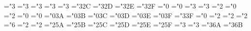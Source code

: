 { \def\bmuparrow{\delimiter"3\mtbsy@@22378 }%
 \def\bmdownarrow{\delimiter"3\mtbsy@@23379 }%
 \mathchardef\bmnearrow="3
 \mathchardef\bmsearrow="3
 \mathchardef\bmsimeq="3
 \mathchardef\bmLeftarrow="3
 \mathchardef\bmRightarrow="3
 \def\bmUparrow{\delimiter"3\mtbsy@@2A\mtbex@@7E }%
 \def\bmDownarrow{\delimiter"3\mtbsy@@2B\mtbex@@7F }%
 \mathchardef\bmLeftrightarrow="3\mtbsy@@2C
 \mathchardef\bmnwarrow="3\mtbsy@@2D
 \mathchardef\bmswarrow="3\mtbsy@@2E
 \mathchardef\bmpropto="3\mtbsy@@2F
 \mathchardef\bmprime="0
 \mathchardef\bminfty="0
 \mathchardef\bmin="3
 \mathchardef\bmni="3 \let\bmowns=\bmni
 \mathchardef\bmbigtriangleup="2
 \mathchardef\bmtriangle="0
 \mathchardef\bmbigtriangledown="2
 \mathchardef\bmforall="0
 \mathchardef\bmexists="0
 \mathchardef\bmneg="0\mtbsy@@3A \let\lnot=\neg
 \mathchardef\bmemptyset="0\mtbsy@@3B
 \mathchardef\bmRe="0\mtbsy@@3C
 \mathchardef\bmIm="0\mtbsy@@3D
 \mathchardef\bmtop="0\mtbsy@@3E
 \mathchardef\bmbot="0\mtbsy@@3F
 \mathchardef\bmperp="3\mtbsy@@3F
 \mathchardef\bmaleph="0
 \mathchardef\bmcomp="2
 \def\bmvec{\mathaccent"0\mtbsy@@45 }%
 \mathchardef\bmtriangleright="2
 \mathchardef\bmtriangleleft="2
 \mathchardef\bmcolon="6
 \mathchardef\bmsetdif="2
 \mathchardef\bmcupprod="2
 \mathchardef\bmcapprod="2\mtbsy@@5A
 \mathchardef\bmcup="2\mtbsy@@5B
 \mathchardef\bmcap="2\mtbsy@@5C
 \mathchardef\bmuplus="2\mtbsy@@5D
 \mathchardef\bmwedge="2\mtbsy@@5E \let\bmland=\bmwedge
 \mathchardef\bmvee="2\mtbsy@@5F \let\bmlor=\bmvee
 \mathchardef\bmvdash="3
 \mathchardef\bmdashv="3
 \def\bmlfloor{\delimiter"4\mtbsy@@62\mtbex@@04 }%
 \def\bmrfloor{\delimiter"5\mtbsy@@63\mtbex@@05 }%
 \def\bmlceil{\delimiter"4\mtbsy@@64\mtbex@@06 }%
 \def\bmrceil{\delimiter"5\mtbsy@@65\mtbex@@07 }%
 \def\bmlbrace{\delimiter"4\mtbsy@@66\mtbex@@08 }%
 \def\bmrbrace{\delimiter"5\mtbsy@@67\mtbex@@09 }%
 \def\bmlangle{\delimiter"4\mtbsy@@68\mtbex@@0A }%
 \def\bmrangle{\delimiter"5\mtbsy@@69\mtbex@@0B }%
 \mathchardef\bmmid="3\mtbsy@@6A
 \def\bmvert{\delimiter"\mtbsy@@6A\mtbex@@0C }%
 \mathchardef\bmparallel="3\mtbsy@@6B
 \def\bmVert{\delimiter"\mtbsy@@6B\mtbex@@0D }%
 \def\bmupdownarrow{\delimiter"3\mtbsy@@6C\mtbex@@3F }%
 \def\bmUpdownarrow{\delimiter"3\mtbsy@@6D\mtbex@@77 }%
 \def\bmbackslash{\delimiter"\mtbsy@@6E\mtbex@@0F }%
 \def\bmarrowvert{\delimiter"\mtbsy@@6A\mtbex@@3C }%
 \def\bmArrowvert{\delimiter"\mtbsy@@6\mtbex@@3D }%
}
